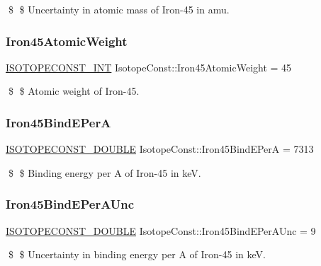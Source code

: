 \$ \$ Uncertainty in atomic mass of Iron-\/45 in amu. \mbox{\label{group___isotope_const-_iron-_fe45_gaaaf1d9cdfec6f81596071108f7977ce9}} 
\subsubsection{\texorpdfstring{Iron45\+Atomic\+Weight}{Iron45AtomicWeight}}
{\footnotesize\ttfamily \mbox{\hyperlink{group___isotope_const-_macros_ga5f18360b3e99483a35c32d789e62621c}{I\+S\+O\+T\+O\+P\+E\+C\+O\+N\+S\+T\+\_\+\+I\+NT}} Isotope\+Const\+::\+Iron45\+Atomic\+Weight = 45}

\$ \$ Atomic weight of Iron-\/45. \mbox{\label{group___isotope_const-_iron-_fe45_ga4644b292a3a838f324193fca4b959f84}} 
\subsubsection{\texorpdfstring{Iron45\+Bind\+E\+PerA}{Iron45BindEPerA}}
{\footnotesize\ttfamily \mbox{\hyperlink{group___isotope_const-_macros_ga8f45a7272ce02c0b4c65c44636ed719a}{I\+S\+O\+T\+O\+P\+E\+C\+O\+N\+S\+T\+\_\+\+D\+O\+U\+B\+LE}} Isotope\+Const\+::\+Iron45\+Bind\+E\+PerA = 7313}

\$ \$ Binding energy per A of Iron-\/45 in keV. \mbox{\label{group___isotope_const-_iron-_fe45_gafac5a0672faf2340798434a1ba17fb67}} 
\subsubsection{\texorpdfstring{Iron45\+Bind\+E\+Per\+A\+Unc}{Iron45BindEPerAUnc}}
{\footnotesize\ttfamily \mbox{\hyperlink{group___isotope_const-_macros_ga8f45a7272ce02c0b4c65c44636ed719a}{I\+S\+O\+T\+O\+P\+E\+C\+O\+N\+S\+T\+\_\+\+D\+O\+U\+B\+LE}} Isotope\+Const\+::\+Iron45\+Bind\+E\+Per\+A\+Unc = 9}

\$ \$ Uncertainty in binding energy per A of Iron-\/45 in keV. \mbox{\label{group___isotope_const-_iron-_fe45_gac70360ba4674aa4c0dd610f4a36645d8}} 
